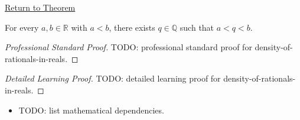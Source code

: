 \newpage
{}
\label{prf:density-of-rationals-in-reals}

\begin{remark*}[Return]
\hyperref[thm:density-of-rationals-in-reals]{Return to Theorem}
\end{remark*}

\begin{theorem*}
For every $a,b\in\mathbb{R}$ with $a<b$, there exists $q\in\mathbb{Q}$ such that $a<q<b$.
\end{theorem*}

\begin{proof}[Professional Standard Proof]
\LRAProofBodyStart
TODO: professional standard proof for density-of-rationals-in-reals.
\end{proof}

\begin{proof}[Detailed Learning Proof]
\LRAProofBodyStart
TODO: detailed learning proof for density-of-rationals-in-reals.
\end{proof}

\begin{remark*}
\end{remark*}

\begin{dependencies}
\begin{itemize}
  \item TODO: list mathematical dependencies.
\end{itemize}
\end{dependencies}

\clearpage
